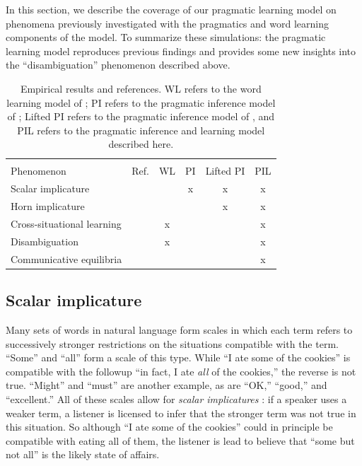\documentclass{article} %
\begin{document}
In this section, we describe the coverage of our pragmatic learning model on phenomena previously investigated with the pragmatics and word learning components of the model. To summarize these simulations: the pragmatic learning model reproduces previous findings and provides some new insights into the ``disambiguation'' phenomenon described above. 

\begin{table}[t]
\label{tab:results}
\begin{center}
\begin{tabular}{lccccc}
\hline \\
Phenomenon & Ref. & WL & PI & Lifted PI  & PIL \\
\hline
Scalar implicature & \cite{grice1975} &  & x &x & x\\
Horn implicature & \cite{horn1984} & &  & x& x\\
Cross-situational learning & \cite{smith2008} & x& & & x \\
Disambiguation & \cite{markman1988} &x  & & & x \\
Communicative equilibria & \cite{galantucci2005} & & & & x \\
\hline
\end{tabular}
\end{center}
\caption{Empirical results and references. WL refers to the word learning model of \cite{frank2009}; PI refers to the pragmatic inference model of \cite{frank2012}; Lifted PI refers to the pragmatic inference model of \cite{bergen2012}, and PIL refers to the pragmatic inference and learning model described here.  }

\end{table}


\subsection{Scalar implicature}

Many sets of words in natural language form scales in which each term refers to successively stronger restrictions on the situations compatible with the term. ``Some'' and ``all'' form a scale of this type. While ``I ate some of the cookies'' is compatible with the followup ``in fact, I ate {\it all} of the cookies,'' the reverse is not true. ``Might'' and ``must'' are another example, as are ``OK,'' ``good,'' and ``excellent.'' All of these scales allow for {\it scalar implicatures} \cite{grice1975}: if a speaker uses a weaker term, a listener is licensed to infer that the stronger term was not true in this situation. So although ``I ate some of the cookies'' could in principle be compatible with eating all of them, the listener is lead to believe that ``some but not all'' is the likely state of affairs. 
\end{document}
